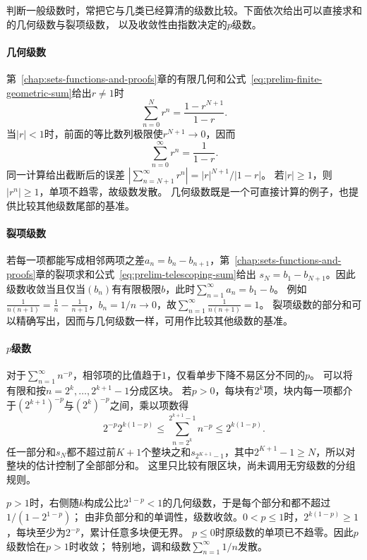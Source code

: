 判断一般级数时，常把它与几类已经算清的级数比较。下面依次给出可以直接求和的几何级数与裂项级数，
以及收敛性由指数决定的$p$级数。

\paragraph{几何级数}
第~\ref{chap:sets-functions-and-proofs}章的有限几何和公式~\eqref{eq:prelim-finite-geometric-sum}给出$r\neq1$时
\[
 \sum_{n=0}^{N}r^n=\frac{1-r^{N+1}}{1-r}.
\]
当$|r|<1$时，前面的等比数列极限使$r^{N+1}\to0$，因而
\begin{equation}
 \sum_{n=0}^{\infty}r^n=\frac{1}{1-r}.
\label{eq:analysis-geometric-series}
\end{equation}
同一计算给出截断后的误差
$|\sum_{n=N+1}^{\infty}r^n|=|r|^{N+1}/|1-r|$。
若$|r|\geq1$，则$|r^n|\geq1$，单项不趋零，故级数发散。
几何级数既是一个可直接计算的例子，也提供比较其他级数尾部的基准。

\paragraph{裂项级数}
若每一项都能写成相邻两项之差$a_n=b_n-b_{n+1}$，第~\ref{chap:sets-functions-and-proofs}章的裂项求和公式~\eqref{eq:prelim-telescoping-sum}给出
$s_N=b_1-b_{N+1}$。因此级数收敛当且仅当$(b_n)$有有限极限$b$，此时$\sum_{n=1}^\infty a_n=b_1-b$。
例如$\frac1{n(n+1)}=\frac1n-\frac1{n+1}$，$b_n=1/n\to0$，故$\sum_{n=1}^\infty\frac1{n(n+1)}=1$。
裂项级数的部分和可以精确写出，因而与几何级数一样，可用作比较其他级数的基准。

\paragraph{$p$级数}
对于$\sum_{n=1}^{\infty}n^{-p}$，相邻项的比值趋于$1$，仅看单步下降不易区分不同的$p$。
可以将有限和按$n=2^k,\ldots,2^{k+1}-1$分成区块。
若$p>0$，每块有$2^k$项，块内每一项都介于$(2^{k+1})^{-p}$与$(2^k)^{-p}$之间，乘以项数得
\[
 2^{-p}2^{k(1-p)}
 \leq\sum_{n=2^k}^{2^{k+1}-1}n^{-p}
 \leq2^{k(1-p)}.
\]
任一部分和$s_N$都不超过前$K+1$个整块之和$s_{2^{K+1}-1}$，其中$2^{K+1}-1\geq N$，所以对整块的估计控制了全部部分和。
这里只比较有限区块，尚未调用无穷级数的分组规则。

$p>1$时，右侧随$k$构成公比$2^{1-p}<1$的几何级数，于是每个部分和都不超过$1/(1-2^{1-p})$；
由非负部分和的单调性，级数收敛。$0<p\leq1$时，$2^{k(1-p)}\geq1$，每块至少为$2^{-p}$，累计任意多块便无界。
$p\leq0$时原级数的单项已不趋零。因此$p$级数恰在$p>1$时收敛；
特别地，调和级数$\sum_{n=1}^{\infty}1/n$发散。


